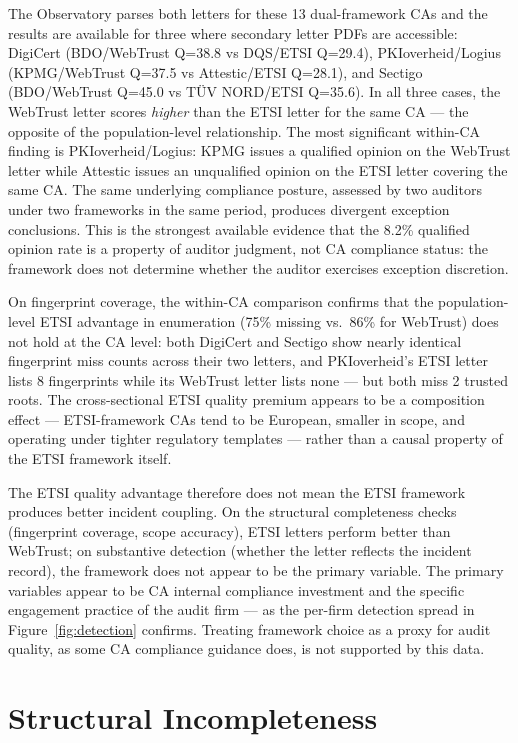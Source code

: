 \documentclass[10pt,twocolumn,letterpaper]{article}
\begin{document}
The Observatory parses both letters for these 13 dual-framework CAs and
the results are available for three where secondary letter PDFs are
accessible: DigiCert (BDO/WebTrust Q=38.8 vs DQS/ETSI Q=29.4),
PKIoverheid/Logius (KPMG/WebTrust Q=37.5 vs Attestic/ETSI Q=28.1),
and Sectigo (BDO/WebTrust Q=45.0 vs T\"{U}V NORD/ETSI Q=35.6). In all
three cases, the WebTrust letter scores \textit{higher} than the ETSI
letter for the same CA --- the opposite of the population-level
relationship. The most significant within-CA finding is PKIoverheid/Logius:
KPMG issues a qualified opinion on the WebTrust letter while Attestic
issues an unqualified opinion on the ETSI letter covering the same CA.
The same underlying compliance posture, assessed by two auditors under
two frameworks in the same period, produces divergent exception
conclusions. This is the strongest available evidence that the 8.2\%
qualified opinion rate is a property of auditor judgment, not CA
compliance status: the framework does not determine whether the
auditor exercises exception discretion.

On fingerprint coverage, the within-CA comparison confirms that
the population-level ETSI advantage in enumeration (75\% missing
vs.\ 86\% for WebTrust) does not hold at the CA level: both
DigiCert and Sectigo show nearly identical fingerprint miss counts
across their two letters, and PKIoverheid's ETSI letter lists 8
fingerprints while its WebTrust letter lists none --- but both miss 2
trusted roots. The cross-sectional ETSI quality premium appears to
be a composition effect --- ETSI-framework CAs tend to be European,
smaller in scope, and operating under tighter regulatory templates
--- rather than a causal property of the ETSI framework itself.

The ETSI quality advantage therefore does not mean the ETSI framework
produces better incident coupling. On the structural completeness checks
(fingerprint coverage, scope accuracy), ETSI letters perform better
than WebTrust; on substantive detection (whether the letter reflects
the incident record), the framework does not appear to be the primary
variable. The primary variables appear to be CA
internal compliance investment and the specific engagement practice
of the audit firm --- as the per-firm detection spread in
Figure~\ref{fig:detection} confirms. Treating framework choice as
a proxy for audit quality, as some CA compliance guidance does,
is not supported by this data.

\section{Structural Incompleteness}
\label{sec:completeness}
\end{document}
